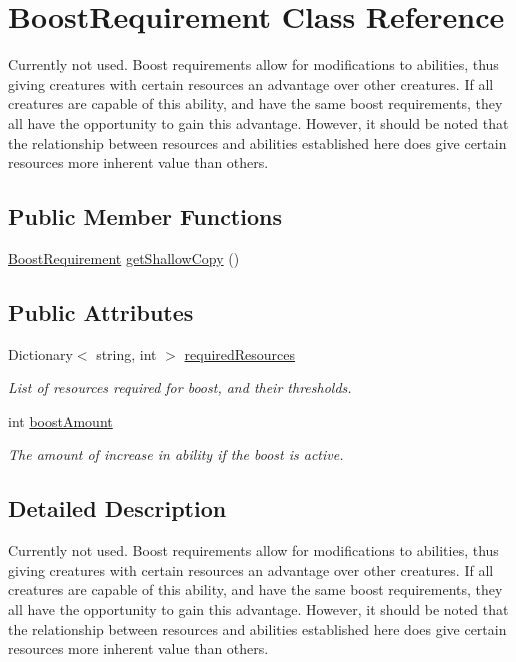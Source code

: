 \hypertarget{class_boost_requirement}{}\section{Boost\+Requirement Class Reference}
\label{class_boost_requirement}


Currently not used. Boost requirements allow for modifications to abilities, thus giving creatures with certain resources an advantage over other creatures. If all creatures are capable of this ability, and have the same boost requirements, they all have the opportunity to gain this advantage. However, it should be noted that the relationship between resources and abilities established here does give certain resources more inherent value than others.  


\subsection*{Public Member Functions}
\begin{DoxyCompactItemize}
\item 
\mbox{\hyperlink{class_boost_requirement}{Boost\+Requirement}} \mbox{\hyperlink{class_boost_requirement_aebc683969c2561e56a2b45d98d54876d}{get\+Shallow\+Copy}} ()
\end{DoxyCompactItemize}
\subsection*{Public Attributes}
\begin{DoxyCompactItemize}
\item 
Dictionary$<$ string, int $>$ \mbox{\hyperlink{class_boost_requirement_ad0415c1e37d462bffcf3c3e4dbf69eed}{required\+Resources}}
\begin{DoxyCompactList}\small\item\em List of resources required for boost, and their thresholds. \end{DoxyCompactList}\item 
int \mbox{\hyperlink{class_boost_requirement_ace675651f02aff4a40aecc2ab40d4822}{boost\+Amount}}
\begin{DoxyCompactList}\small\item\em The amount of increase in ability if the boost is active. \end{DoxyCompactList}\end{DoxyCompactItemize}


\subsection{Detailed Description}
Currently not used. Boost requirements allow for modifications to abilities, thus giving creatures with certain resources an advantage over other creatures. If all creatures are capable of this ability, and have the same boost requirements, they all have the opportunity to gain this advantage. However, it should be noted that the relationship between resources and abilities established here does give certain resources more inherent value than others. 



